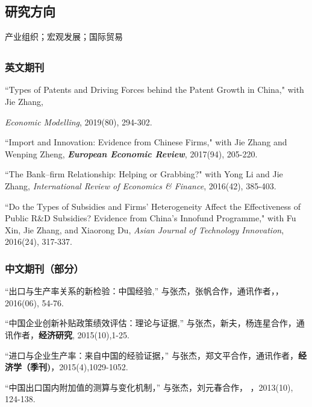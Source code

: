 \documentclass[letterpaper]{article}
\begin{document}
\subsection*{\bf{研究方向}}
产业组织；宏观发展；国际贸易



\subsection*{}

\subsubsection*{英文期刊}
``Types of Patents and Driving Forces behind the Patent Growth in China," with Jie Zhang, {\textit{Economic Modelling}, 2019(80), 294-302.

\vspace{0.5em}
``Import and Innovation: Evidence from Chinese Firms," with Jie Zhang and Wenping Zheng, {\textbf{\textit{European Economic Review}}}, 2017(94), 205-220.

\vspace{0.5em}
``The Bank–firm Relationship: Helping or Grabbing?" with Yong Li and Jie Zhang, {\textit{International Review of Economics \& Finance}}, 2016(42), 385-403.

\vspace{0.5em}
``Do the Types of Subsidies and Firms’ Heterogeneity Affect the Effectiveness of Public R\&D Subsidies? Evidence from China’s Innofund Programme," with Fu Xin, Jie Zhang, and Xiaorong Du, \textit{Asian Journal of Technology Innovation}, 2016(24), 317-337.

\subsubsection*{中文期刊（部分）}
“出口与生产率关系的新检验：中国经验,” 与张杰，张帆合作，通讯作者，{}，2016(06), 54-76.

\vspace{0.5em}
“中国企业创新补贴政策绩效评估：理论与证据,” 与张杰，新夫，杨连星合作，通讯作者，{\bf 经济研究}, 2015(10),1-25.

\vspace{0.5em}
“进口与企业生产率：来自中国的经验证据，” 与张杰，郑文平合作，通讯作者，{\bf 经济学（季刊)}，2015(4),1029-1052.

\vspace{0.5em}
“中国出口国内附加值的测算与变化机制，” 与张杰，刘元春合作， {}，2013(10), 124-138.

}
\end{document}
